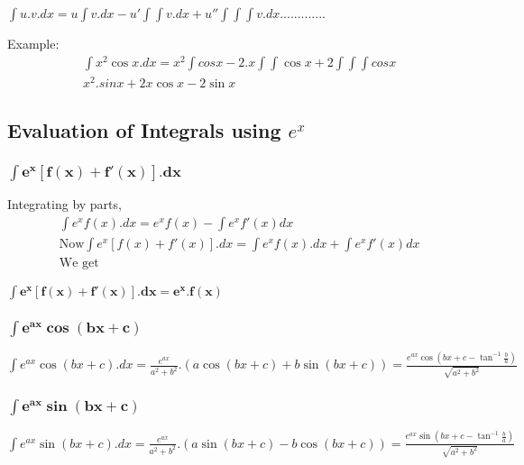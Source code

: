 \begin{tcolorbox}
\begin{center}
$ \int u.v.dx = u \int v.dx - u'\int\int v.dx + u''\int\int\int v.dx.............$
\end{center}
\end{tcolorbox}

\vspace{2mm}
\noindent
Example: \\
\begin{align*}
&\int {x^2}\cos x.dx = x^2 \int cos x - 2.x \int \int \cos x + 2 \int \int \int cos x \\
& x^2.sin x + 2x \cos x - 2 \sin x
\end{align*}

\subsection{Evaluation of Integrals using $ e^x $}
\subsubsection{$ \mathbf{\int e^x[f(x) + f'(x)].dx} $}
Integrating by parts, \\
\begin{align*}
&\int e^xf(x).dx = e^xf(x) - \int e^x f'(x)dx \\
&\text{Now} \int e^x[f(x)+f'(x)].dx = \int e^xf(x).dx + \int e^xf'(x)dx \\
&\text{We get} 
\end{align*}
\vspace{1mm}
\begin{tcolorbox}
\begin{center}
$ \mathbf{\int e^x[ f(x) + f'(x) ].dx = e^x.f(x)} $
\end{center}
\end{tcolorbox}
\subsubsection{$ \mathbf{\int e^{ax}\cos(bx+c)} $}
\begin{tcolorbox}
\begin{center}
$ \int e^{ax} \cos (bx+c).dx = \frac{e^{ax}}{a^2+b^2}.(a \cos (bx+c)+ b \sin (bx+c))
= \frac{e^{ax} \cos \left( bx+c - \tan^{-1}\frac{b}{a} \right)}{\sqrt{a^2+b^2}} $
\end{center}
\end{tcolorbox}
\subsubsection{$ \mathbf{\int e^{ax}\sin(bx+c)} $}
\begin{tcolorbox}
\begin{center}
$ \int e^{ax} \sin (bx+c).dx = \frac{e^{ax}}{a^2+b^2}.(a \sin (bx+c) - b \cos (bx+c))
= \frac{e^{ax} \sin \left( bx+c - \tan^{-1}\frac{b}{a} \right)}{\sqrt{a^2+b^2}} $
\end{center}
\end{tcolorbox}

